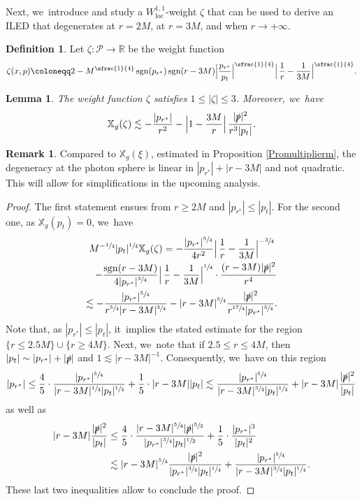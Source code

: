 \documentclass[10pt]{amsart}
\DeclareMathOperator{\sgn}{sgn}
\theoremstyle{plain}
\newtheorem{lemma}[proposition]{Lemma}
\theoremstyle{definition}
\newtheorem{definition}[proposition]{Definition}
\newtheorem{remark}[proposition]{Remark}
\newcommand\R{{\mathbb{R}}}
\newcommand\z{{\zeta}}
\newcommand\T{{\mathbb{X}}}
\begin{document}
Next, we~introduce and study a $W^{1,1}_{\mathrm{loc}}$-weight $\zeta$ that can be used to derive an ILED that degenerates at $r=2M$, at $r=3M$, and when $r \to +\infty$.
\begin{definition}\label{Defz}
Let $\z \colon \mathcal{P}\to \R$ be the weight function
\[
\z(x,p) \coloneqq 2 -M^{\sfrac{1}{4}} \sgn(p_{r^*}) \sgn(r-3M) \Big|\frac{p_{r^*}}{p_t} \Big|^{\sfrac{1}{4}}\Big| \, \frac{1}{r} -\frac{1}{3M} \Big|^{\sfrac{1}{4}}.
\]
\end{definition}
\begin{lemma}\label{LemPropz}
The weight function $\z$ satisfies $1 \leq |\z| \leq 3$. Moreover, we~have
\[
\T_g (\z) \lesssim - \frac{|p_{r^*}|}{r^2}-\Big| 1-\frac{3M}{r} \Big| \, \frac{|\slashed{p}|^2}{r^3|p_t|}.
\]
\end{lemma}
\begin{remark}
Compared to $\T_g(\xi)$, estimated in Proposition \ref{Promultiplierm}, the degeneracy at the photon sphere is linear in $|p_{r^*}|+|r-3M|$ and not quadratic. This will allow for simplifications in the upcoming analysis.
\end{remark}
\begin{proof}
The first statement ensues from $r \geq 2M$ and $|p_{r^*}| \leq |p_t|$. For the second one, as $\T_g(p_t)=0$, we~have
\begin{multline*}
M^{-\sfrac{1}{4}}|p_t|^{\sfrac{1}{4}} \T_g (\z) =- \frac{ |p_{r^*}|^{\sfrac{5}{4}}}{4r^2}\Big| \, \frac{1}{r} -\frac{1}{3M} \Big|^{-\sfrac{3}{4}}\\
\hspace*{3mm}-\frac{\sgn(r-3M)}{4|p_{r^*}|^{\sfrac{3}{4}}}\Big| \, \frac{1}{r} -\frac{1}{3M} \Big|^{\sfrac{1}{4}} \cdot \frac{(r-3M)|\slashed{p}|^2}{r^4} \\
 \lesssim -\frac{|p_{r^*}|^{\sfrac{5}{4}}}{r^{\sfrac{5}{4}} |r-3M|^{\sfrac{3}{4}}}-|r-3M|^{\sfrac{5}{4}}\frac{|\slashed{p}|^2}{r^{\sfrac{17}{4}}|p_{r^*}|^{\sfrac{3}{4}}}.
\end{multline*}
Note that, as $|p_{r^*}| \leq |p_t|$, it~implies the stated estimate for the region $ \{r \leq 2.5M \} \cup \{ r \geq 4M \}$. Next, we~note that if $2.5 \leq r \leq 4M$, then $|p_t| \sim |p_{r^*}|+|\slashed{p}|$ and $1 \lesssim |r-3M|^{-1}$. Consequently, we~have on this region
\[
|p_{r^*}| \leq \frac{4}{5} \cdot \frac{|p_{r^*}|^{\sfrac{5}{4}}}{|r-3M|^{\sfrac{1}{4}}|p_t|^{\sfrac{1}{4}}}+\frac{1}{5}\cdot |r-3M||p_t| \lesssim \frac{|p_{r^*}|^{\sfrac{5}{4}}}{ |r-3M|^{\sfrac{3}{4}}|p_t|^{\sfrac{1}{4}}} + |r-3M|\frac{|\slashed{p}|^2}{|p_t|}
\]
as well as
\begin{align*}
|r-3M|\frac{|\slashed{p}|^2}{|p_t|} &\leq \frac{4}{5} \cdot \frac{|r-3M|^{\sfrac{5}{4}} |\slashed{p}|^{\sfrac{5}{2}}}{|p_{r^*}|^{\sfrac{3}{4}}|p_t|^{\sfrac{1}{2}}}+\frac{1}{5}\cdot \frac{|p_{r^*}|^3}{|p_t|^2}\\
&\lesssim |r-3M|^{\sfrac{5}{4}}\frac{|\slashed{p}|^2}{|p_{r^*}|^{\sfrac{3}{4}}|p_t|^{\sfrac{1}{4}}}+ \frac{|p_{r^*}|^{\sfrac{5}{4}}}{ |r-3M|^{\sfrac{3}{4}}|p_t|^{\sfrac{1}{4}}}.
\end{align*}
These last two inequalities allow to conclude the proof.
\end{proof}
\end{document}
